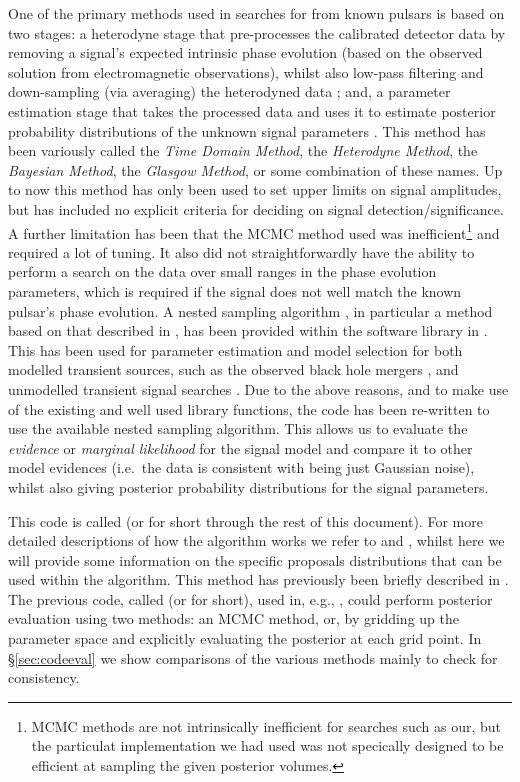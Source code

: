 One of the primary methods used in searches for \gws from known pulsars is based on two stages: a heterodyne
stage that pre-processes the calibrated \gw detector data by removing a signal's expected intrinsic phase
evolution (based on the observed solution from electromagnetic observations), whilst also low-pass filtering and
down-sampling (via averaging) the heterodyned data \citep{2005PhRvD..72j2002D}; and, a parameter estimation stage that takes the
processed data and uses it to estimate posterior probability distributions of the unknown signal parameters
\citep[e.g., using a Markov chain Monte Carlo (MCMC)][]{2010ApJ...713..671A}. This method has been variously
called the {\it Time Domain Method}, the {\it Heterodyne Method}, the {\it Bayesian Method}, the {\it Glasgow
Method}, or some combination of these names. Up to now this method has only been used to set upper limits
on signal amplitudes, but has included no explicit criteria for deciding on signal detection/significance. A further
limitation has been that the MCMC method used was inefficient\footnote{MCMC methods are not intrinsically inefficient for
searches such as our, but the particulat implementation we had used was not specically designed to be efficient at sampling the
given posterior volumes.} and required a lot of tuning. It also
did not straightforwardly have the ability to perform a search on the data over small ranges in the phase
evolution parameters, which is required if the \gw signal does not well match the known pulsar's phase evolution. A nested sampling
algorithm \citep{Skilling:2006}, in particular a method based on that described in \citet{Veitch:2010}, has been provided within
the \lalinf software library \citep{2015PhRvD..91d2003V} in \citet{lalsuite}. This has been used for parameter estimation and model
selection for both modelled transient sources, such as the observed black hole mergers \citep{2016PhRvL.116x1102A}, and unmodelled transient signal
searches \citep{2015arXiv151105955L}. Due to the above reasons, and to make use of the existing and well used library functions, the code has been
re-written to use the available nested sampling algorithm. This allows us to evaluate the {\it evidence} or {\it
marginal likelihood} for the signal model and compare it to other model evidences (i.e.\ the data is consistent with being just
Gaussian noise), whilst also giving posterior probability distributions for the signal parameters.

This code is called \lppenf (or \lppen for short through the rest of this document). For more detailed descriptions of how the algorithm works we refer
to \citet{Veitch:2010} and \citep{2015PhRvD..91d2003V}, whilst here we will provide some information on the specific proposals
distributions that can be used within the algorithm. This method has previously been briefly described in \citet{2012JPhCS.363a2041P}.
The previous code, called \lppef (or \lppe for short), used in, e.g., \citet{2010ApJ...713..671A}, could perform posterior evaluation
using two methods: an MCMC method, or, by gridding up the parameter space and explicitly evaluating the posterior at each
grid point. In \S\ref{sec:codeeval} we show comparisons of the various methods mainly to check \lppen for consistency.

